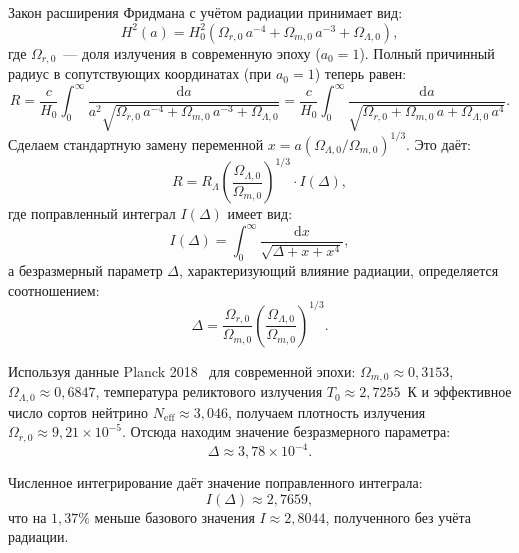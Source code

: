 \documentclass[12pt,a4paper]{article}
\begin{document}
Закон расширения Фридмана с учётом радиации принимает вид:
\begin{equation}
H^2(a) = H_0^2 \left( \Omega_{r,0}\,a^{-4} + \Omega_{m,0}\,a^{-3} + \Omega_{\Lambda,0} \right),
\end{equation}
где $\Omega_{r,0}$~--- доля излучения в современную эпоху ($a_0=1$). Полный причинный радиус в сопутствующих координатах (при $a_0 = 1$) теперь равен:
\begin{equation}
R = \frac{c}{H_0} \int_0^{\infty} \frac{\mathrm{d}a}{a^2 \sqrt{\Omega_{r,0}\,a^{-4} + \Omega_{m,0}\,a^{-3} + \Omega_{\Lambda,0}}} = \frac{c}{H_0} \int_0^{\infty} \frac{\mathrm{d}a}{\sqrt{\Omega_{r,0} + \Omega_{m,0}\,a + \Omega_{\Lambda,0}\,a^4}}.
\end{equation}
Сделаем стандартную замену переменной $x = a \left(\Omega_{\Lambda,0}/\Omega_{m,0}\right)^{1/3}$. Это даёт:
\begin{equation}
R = R_\Lambda \left(\frac{\Omega_{\Lambda,0}}{\Omega_{m,0}}\right)^{1/3} \cdot I(\Delta),
\end{equation}
где поправленный интеграл $I(\Delta)$ имеет вид:
\begin{equation}
I(\Delta) = \int_0^{\infty} \frac{\mathrm{d}x}{\sqrt{\Delta + x + x^4}},
\end{equation}
а безразмерный параметр $\Delta$, характеризующий влияние радиации, определяется соотношением:
\begin{equation}
\Delta = \frac{\Omega_{r,0}}{\Omega_{m,0}} \left(\frac{\Omega_{\Lambda,0}}{\Omega_{m,0}}\right)^{1/3}.
\end{equation}

Используя данные Planck 2018~\cite{Planck2018} для современной эпохи: $\Omega_{m,0} \approx 0{,}3153$, $\Omega_{\Lambda,0} \approx 0{,}6847$, температура реликтового излучения $T_0 \approx 2{,}7255$~К и эффективное число сортов нейтрино $N_{\mathrm{eff}} \approx 3{,}046$, получаем плотность излучения $\Omega_{r,0} \approx 9{,}21 \times 10^{-5}$. Отсюда находим значение безразмерного параметра:
\begin{equation}
\Delta \approx 3{,}78 \times 10^{-4}.
\end{equation}

Численное интегрирование даёт значение поправленного интеграла:
\begin{equation}
I(\Delta) \approx 2{,}7659,
\end{equation}
что на $1{,}37\%$ меньше базового значения $I \approx 2{,}8044$, полученного без учёта радиации. 
\end{document}
